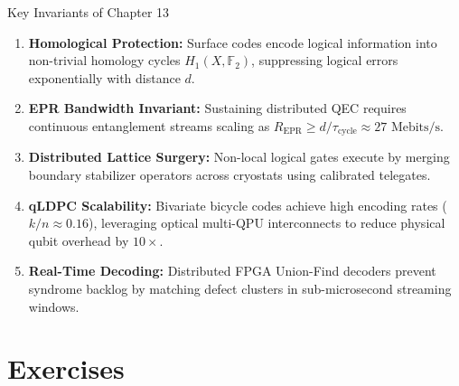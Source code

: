 
\begin{summarybox}{Key Invariants of Chapter 13}
\begin{enumerate}
    \item \textbf{Homological Protection:} Surface codes encode logical information into non-trivial homology cycles $H_1(X, \mathbb{F}_2)$, suppressing logical errors exponentially with distance $d$.
    \item \textbf{EPR Bandwidth Invariant:} Sustaining distributed QEC requires continuous entanglement streams scaling as $R_{\text{EPR}} \ge d / \tau_{\text{cycle}} \approx 27\text{ Mebits/s}$.
    \item \textbf{Distributed Lattice Surgery:} Non-local logical gates execute by merging boundary stabilizer operators across cryostats using calibrated telegates.
    \item \textbf{qLDPC Scalability:} Bivariate bicycle codes achieve high encoding rates ($k/n \approx 0.16$), leveraging optical multi-QPU interconnects to reduce physical qubit overhead by $10\times$.
    \item \textbf{Real-Time Decoding:} Distributed FPGA Union-Find decoders prevent syndrome backlog by matching defect clusters in sub-microsecond streaming windows.
\end{enumerate}
\end{summarybox}


\section*{Exercises}

